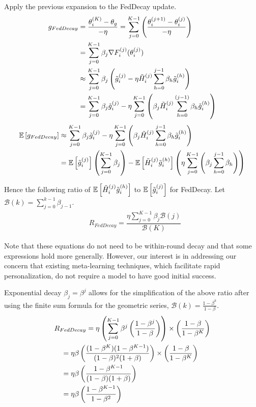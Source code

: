 Apply the previous expansion to the FedDecay update.
\begin{align*}
    \allowdisplaybreaks
    g_{FedDecay} &= \dfrac{\theta_i^{(K)} - \theta_g}{- \eta} = \sum_{j = 0}^{K - 1} \left( \dfrac{\theta_i^{(j + 1)} - \theta_i^{(j)} }{- \eta} \right) \\
        &= \sum_{j = 0}^{K - 1} \beta_{j} \nabla F_i^{(j)}(\theta_i^{(j)}) \\
        &\approx \sum_{j = 0}^{K - 1} \beta_{j} \left( \Tilde{g}_i^{(j)} - \eta \Tilde{H}_i^{(j)} \sum_{h = 0}^{j - 1} \beta_{h} \Tilde{g}_i^{(h)} \right) \\
        &= \sum_{j = 0}^{K - 1} \beta_{j} \Tilde{g}_i^{(j)} - \eta \sum_{j = 0}^{K - 1} \left( \beta_{j} \Tilde{H}_i^{(j)} \sum_{h = 0}^{(j - 1)} \beta_{h} \Tilde{g}_i^{(h)} \right) 
\end{align*}
\begin{align*}
    \allowdisplaybreaks
    \mathbb{E} \left[g_{FedDecay} \right] &\approx \sum_{j = 0}^{K - 1} \beta_{j} \Tilde{g}_i^{(j)} - \eta \sum_{j = 0}^{K - 1} \left( \beta_{j} \Tilde{H}_i^{(j)} \sum_{h = 0}^{j - 1} \beta_{h} \Tilde{g}_i^{(h)} \right) \\
        &= \mathbb{E} \left[ \Tilde{g}_i^{(j)} \right] \left( \sum_{j = 0}^{K - 1} \beta_{j} \right) - \mathbb{E} \left[ \Tilde{H}_i^{(j)} \Tilde{g}_i^{(h)} \right] \left( \eta \sum_{j = 0}^{K - 1} \left( \beta_{j} \sum_{h = 0}^{j - 1} \beta_{h} \right) \right)\\
\end{align*}

Hence the following ratio of $\mathbb{E} \left[ \Tilde{H}_i^{(j)} \Tilde{g}_i^{(h)} \right]$ to $\mathbb{E} \left[ \Tilde{g}_i^{(j)} \right]$ for FedDecay.
Let $\mathcal{B}(k) = \sum_{j = 0}^{k - 1} \beta_{j - 1}$.
\begin{align*}
    & R_{FedDecay} = \dfrac{\eta \sum_{j = 0}^{K - 1} \beta_j \mathcal{B}(j)}{\mathcal{B}(K)}
\end{align*}

Note that these equations do not need to be within-round decay and that some expressions hold more generally. 
However, our interest is in addressing our concern that existing meta-learning techniques, which facilitate rapid personalization, do not require a model to have good initial success. 

Exponential decay $\beta_{j} = \beta^{j}$ allows for the simplification of the above ratio after using the finite sum formula for the geometric series, $\mathcal{B}(k) = \frac{1 - \beta^k}{1 - \beta}$. 
\begin{align*}
    \allowdisplaybreaks
    & R_{FedDecay} = \eta \left( \sum_{j = 0}^{K - 1} \beta^{j} \left( \frac{1 - \beta^{j}}{1 - \beta} \right) \right) \times \left( \frac{1 - \beta}{1 - \beta^K} \right) \\
    & \quad = \eta \beta \left( \dfrac{(1 - \beta^K)(1 - \beta^{K - 1})}{(1 - \beta)^2 (1 + \beta)} \right) \times \left( \frac{1 - \beta}{1 - \beta^K} \right) \\
    & \quad = \eta \beta \left( \dfrac{1 - \beta^{K - 1}}{(1 - \beta)(1 + \beta)} \right) \\
    & \quad = \eta \beta \left( \dfrac{1 - \beta^{K - 1}}{1 - \beta^2} \right)
\end{align*}